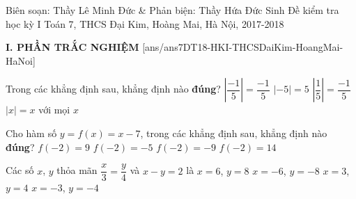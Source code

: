 	\begin{name}
		{Biên soạn: Thầy Lê Minh Đức \& Phản biện: Thầy Hứa Đức Sinh}
		{Đề kiểm tra học kỳ I Toán 7, THCS Đại Kim, Hoàng Mai, Hà Nội, 2017-2018}
	\end{name}
	\noindent\textbf{I. PHẦN TRẮC NGHIỆM}
	\setcounter{ex}{0}
	[ans/ans7DT18-HKI-THCSDaiKim-HoangMai-HaNoi]
\begin{ex}%
	Trong các khẳng định sau, khẳng định nào \textbf{đúng}?
	\choice
	{$\left|\dfrac{-1}{5}\right|=\dfrac{-1}{5}$}
	{\True $|-5|=5$}
	{$\left|\dfrac{1}{5}\right|=\dfrac{-1}{5}$}
	{$|x|=x$ với mọi $x$}
	\loigiai{
	}
\end{ex}

\begin{ex}%
	Cho hàm số $y=f(x)=x-7$, trong các khẳng định sau, khẳng định nào \textbf{đúng}?
	\choice
	{$f(-2)=9$}
	{$f(-2)=-5$}
	{\True $f(-2)=-9$}
	{$f(-2)=14$}
	\loigiai{
	}
\end{ex}

\begin{ex}%
	Các số $x$, $y$ thỏa mãn $\dfrac{x}{3}=\dfrac{y}{4}$ và $x-y=2$ là
	\choice
	{$x=6$, $y=8$}
	{\True $x=-6$, $y=-8$}
	{$x=3$, $y=4$}
	{$x=-3$, $y=-4$}
\end{ex}

